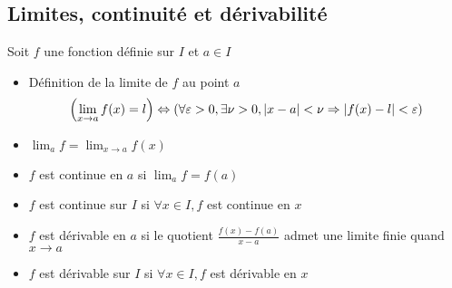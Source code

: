 \documentclass[11pt,colorlinks]{book}
\theoremstyle{mytheoremstyle}
\theoremstyle{mytheoremstyle}
\theoremstyle{mytheoremstyle}
\theoremstyle{mytheoremstyle}
\theoremstyle{mytheoremstyle}
\theoremstyle{mytheoremstyle}
\theoremstyle{mytheoremstyle}
\theoremstyle{mytheoremstyle}
\theoremstyle{myproblemstyle}
\begin{document}
\subsection{Limites, continuité et dérivabilité}
\begin{rmq}
  Soit $f$ une fonction définie sur $I$ et $a \in I$
  \begin{itemize}
    \item Définition de la limite de $f$ au point $a$
    \begin{equation*}
      \left(\lim_{x \to a} f(x) = l\right) \Leftrightarrow \left(\forall \varepsilon > 0, \exists 
      \nu > 0, \abs{x-a} < \nu \Rightarrow \abs{f(x) - l} < \varepsilon\right)
    \end{equation*}
    \item $\lim_a f = \lim_{x \to a} f(x)$ 
    \item $f$ est continue en $a$ si $\lim_a f = f(a)$ 
    \item $f$ est continue sur $I$ si $\forall x \in I, f$ est continue en $x$
    \item $f$ est dérivable en $a$ si le quotient $\frac{f(x) - f(a)}{x - a}$ admet une limite finie quand $x \to a$
    \item $f$ est dérivable sur $I$ si $\forall x \in I, f$ est dérivable en $x$
  \end{itemize}
\end{rmq}
\end{document}
